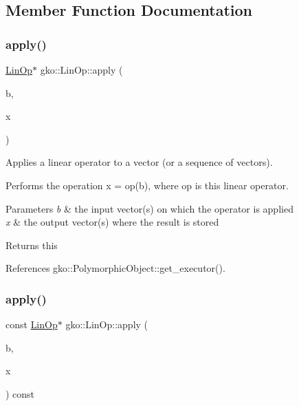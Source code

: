 \subsection{Member Function Documentation}
\mbox{\label{classgko_1_1LinOp_a0449b2fc705d2f970855af23b5e2788e}} 
\subsubsection{\texorpdfstring{apply()}{apply()}\hspace{0.1cm}{\footnotesize\ttfamily [1/4]}}
{\footnotesize\ttfamily \hyperlink{classgko_1_1LinOp}{Lin\+Op}$\ast$ gko\+::\+Lin\+Op\+::apply (\begin{DoxyParamCaption}\item[{const \hyperlink{classgko_1_1LinOp}{Lin\+Op} $\ast$}]{b,  }\item[{\hyperlink{classgko_1_1LinOp}{Lin\+Op} $\ast$}]{x }\end{DoxyParamCaption})\hspace{0.3cm}{\ttfamily [inline]}}



Applies a linear operator to a vector (or a sequence of vectors). 

Performs the operation x = op(b), where op is this linear operator.


\begin{DoxyParams}{Parameters}
{\em b} & the input vector(s) on which the operator is applied \\
\hline
{\em x} & the output vector(s) where the result is stored\\
\hline
\end{DoxyParams}
\begin{DoxyReturn}{Returns}
this 
\end{DoxyReturn}


References gko\+::\+Polymorphic\+Object\+::get\+\_\+executor().

\mbox{\label{classgko_1_1LinOp_a74afc0e94716dbf4f3e1d7182e37456f}} 
\subsubsection{\texorpdfstring{apply()}{apply()}\hspace{0.1cm}{\footnotesize\ttfamily [2/4]}}
{\footnotesize\ttfamily const \hyperlink{classgko_1_1LinOp}{Lin\+Op}$\ast$ gko\+::\+Lin\+Op\+::apply (\begin{DoxyParamCaption}\item[{const \hyperlink{classgko_1_1LinOp}{Lin\+Op} $\ast$}]{b,  }\item[{\hyperlink{classgko_1_1LinOp}{Lin\+Op} $\ast$}]{x }\end{DoxyParamCaption}) const\hspace{0.3cm}{\ttfamily [inline]}}




